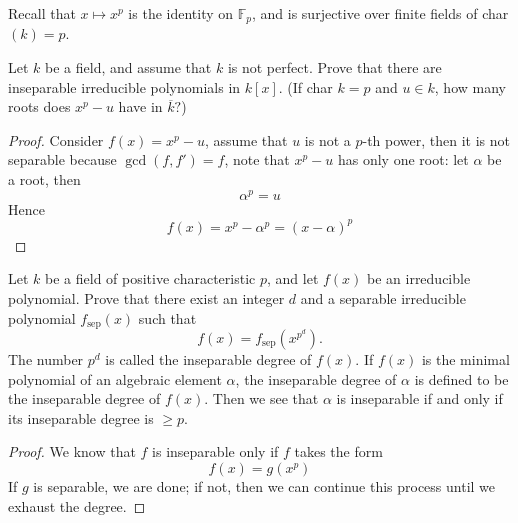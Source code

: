\documentclass[openany]{book}
\newcommand{\F}{\mathbb{F}}
\begin{document}
    Recall that $x\mapsto x^{p}$ is the identity on $\F_p$, and is surjective over finite fields of char$(k)=p$.
    
    
    \begin{prob}
    Let \( k \) be a field, and assume that \( k \) is not perfect. Prove that there are inseparable irreducible polynomials in \( k[x] \). (If char \( k = p \) and \( u \in k \), how many roots does \( x^p - u \) have in \( \overline{k}? \))
    \end{prob}
    \begin{proof}
        Consider $f(x)=x^p-u$, assume that $u$ is not a $p$-th power, then it is not separable because $\gcd(f,f')=f$, note that $x^p-u$ has only one root: let $\alpha$ be a root, then 
        \begin{equation*}
            \alpha^p=u
        \end{equation*}
        Hence 
        \begin{equation*}
            f(x)=x^p-\alpha^p=(x-\alpha)^p
        \end{equation*}
    \end{proof}
    
    
    
    \begin{prob}
    Let \( k \) be a field of positive characteristic \( p \), and let \( f(x) \) be an irreducible polynomial. Prove that there exist an integer \( d \) and a separable irreducible polynomial \( f_{\text{sep}}(x) \) such that
    \[
    f(x) = f_{\text{sep}}(x^{p^d}).
    \]
    The number \( p^d \) is called the inseparable degree of \( f(x) \). If \( f(x) \) is the minimal polynomial of an algebraic element \( \alpha \), the inseparable degree of \( \alpha \) is defined to be the inseparable degree of \( f(x) \). Then we see that \( \alpha \) is inseparable if and only if its inseparable degree is \( \geq p \).
    
    \end{prob}
    \begin{proof}
        We know that $f$ is inseparable only if $f$ takes the form 
        \begin{equation*}
            f(x)=g(x^p)
        \end{equation*}
        If $g$ is separable, we are done; if not, then we can continue this process until we exhaust the degree. 
    \end{proof}
    
\end{document}
